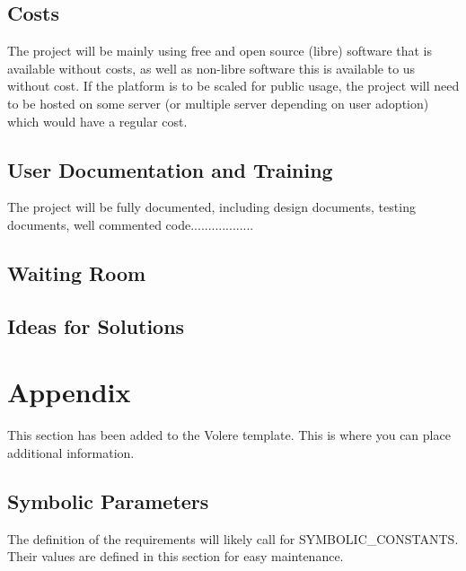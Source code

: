 \documentclass[12pt, titlepage]{article}
\begin{document}
  \subsection{Costs}
  The project will be mainly using free and open source (libre) software that
  is available without costs, as well as non-libre software this is available
  to us without cost. If the platform is to be scaled for public usage, the
  project will need to be hosted on some server (or multiple server depending
  on user adoption) which would have a regular cost.

  \subsection{User Documentation and Training}
  The project will be fully documented, including design documents, testing documents, well commented code..................

  \subsection{Waiting Room}

  \subsection{Ideas for Solutions}





\newpage

\section{Appendix}

This section has been added to the Volere template.  This is where you can
place additional information.

\subsection{Symbolic Parameters}

The definition of the requirements will likely call for SYMBOLIC\_CONSTANTS.
Their values are defined in this section for easy maintenance.
\end{document}
